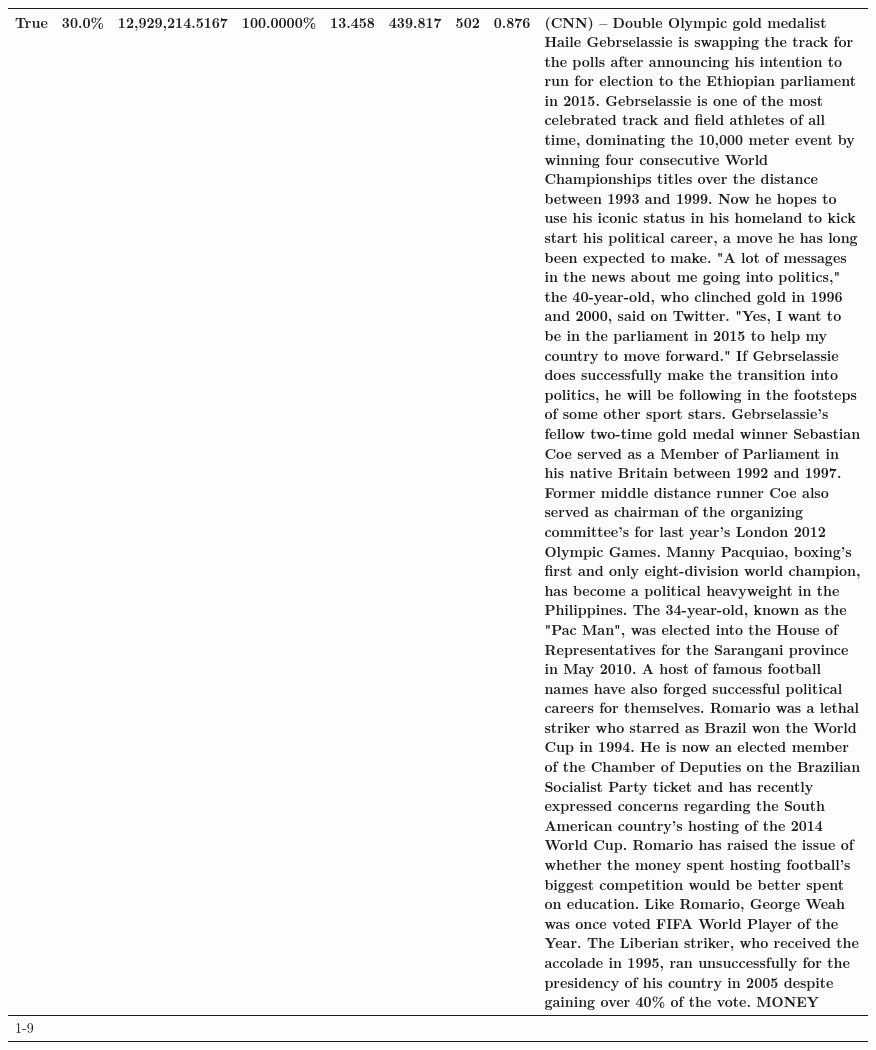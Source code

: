 \begin{table}[H]
{\begin{tabular}{lllrlllll}
True & 30.0\% & 12,929,214.5167 & \bfseries \color{red} 100.0000\% & 13.458 & 439.817 & 502 & 0.876 & (CNN) -- Double Olympic gold medalist Haile Gebrselassie is swapping the track for the polls after announcing his intention to run for election to the Ethiopian parliament in 2015. Gebrselassie is one of the most celebrated track and field athletes of all time, dominating the 10,000 meter event by winning four consecutive World Championships titles over the distance between 1993 and 1999. Now he hopes to use his iconic status in his homeland to kick start his political career, a move he has long been expected to make. "A lot of messages in the news about me going into politics," the 40-year-old, who clinched gold in 1996 and 2000, said on Twitter. "Yes, I want to be in the parliament in 2015 to help my country to move forward." If Gebrselassie does successfully make the transition into politics, he will be following in the footsteps of some other sport stars. Gebrselassie's fellow two-time gold medal winner Sebastian Coe served as a Member of Parliament in his native Britain between 1992 and 1997. Former middle distance runner Coe also served as chairman of the organizing committee's for last year's London 2012 Olympic Games. Manny Pacquiao, boxing's first and only eight-division world champion, has become a political heavyweight in the Philippines. The 34-year-old, known as the "Pac Man", was elected into the House of Representatives for the Sarangani province in May 2010. A host of famous football names have also forged successful political careers for themselves. Romario was a lethal striker who starred as Brazil won the World Cup in 1994. He is now an elected member of the Chamber of Deputies on the Brazilian Socialist Party ticket and has recently expressed concerns regarding the South American country's hosting of the 2014 World Cup. Romario has raised the issue of whether the money spent hosting football's biggest competition would be better spent on education. Like Romario, George Weah was once voted FIFA World Player of the Year. The Liberian striker, who received the accolade in 1995, ran unsuccessfully for the presidency of his country in 2005 despite gaining over 40\% of the vote. MONEY \\
\cline{1-9}

\end{tabular}}
\end{table}
